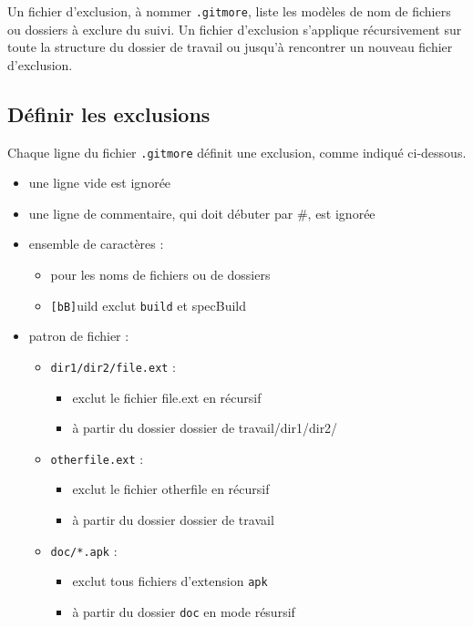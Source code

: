 \documentclass[11pt,twoside,headings=normal,open=right,french,DIV=12]{scrreprt}
\newcommand{\spec}[1]{\texttt{#1}}
\begin{document}
Un fichier d'exclusion, à nommer \spec{.gitmore}, liste les modèles de nom de fichiers ou dossiers à exclure
du suivi. Un fichier d'exclusion s'applique récursivement sur toute la structure du dossier de travail ou jusqu'à rencontrer un nouveau fichier d'exclusion.



\subsection{Définir les exclusions}



    Chaque ligne du fichier \spec{.gitmore} définit une exclusion, comme indiqué ci-dessous.
    \begin{itemize}
    
        \item une ligne vide est ignorée
        \item une ligne de commentaire, qui doit débuter par \#, est ignorée        
        \item ensemble de caractères :
        \begin{itemize}
        		\item pour les noms de fichiers ou de dossiers
        		\item \spec{[bB]}uild exclut \spec{build} et spec{Build}
        \end{itemize}
        \item patron de fichier :
		\begin{itemize}
			\item \spec{dir1/dir2/file.ext} :
			\begin{itemize}
				\item exclut le fichier {file.ext} en récursif
				\item à partir du dossier {dossier de travail/dir1/dir2/}
			\end{itemize}
			\item \spec{otherfile.ext} :
			\begin{itemize}
				\item exclut le fichier {otherfile} en récursif
				\item à partir du dossier {dossier de travail}
			\end{itemize}
			\item \spec{doc/*.apk} : 
			\begin{itemize}
				\item exclut tous fichiers d'extension \spec{apk}
				\item à partir du dossier \spec{doc} en mode résursif

\end{itemize}
\end{itemize}
\end{itemize}
\end{document}
